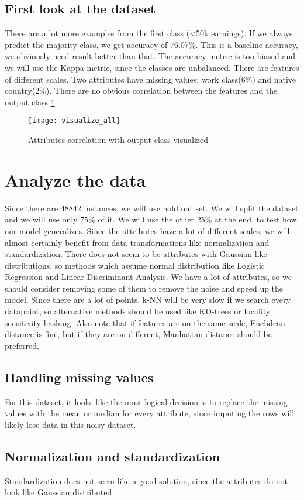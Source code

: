 \section{First look at the dataset}
There are a lot more examples from the first class (<50k earnings). If we always predict the majority class, we get accuracy of 76.07\%. This is a baseline accuracy, we obviously need result better than that. The accuracy metric is too biased and we will use the Kappa metric, since the classes are unbalanced. There are features of different scales. Two attributes have missing values: work class(6\%) and native country(2\%). There are no obvious correlation between the features and the output class \ref{fig:visual}.
\begin{figure}
    \centering
    \texttt{[image: visualize\_all]}
    \caption{Attributes correlation with output class visualized}
    \label{fig:visual}
\end{figure}

\chapter{Analyze the data}
Since there are 48842 instances, we will use hold out set. We will split the dataset and we will use only 75\% of it. We will use the other 25\% at the end, to test how our model generalizes. Since the attributes have a lot of different scales, we will almost certainly benefit from data transformations like normalization and standardization. There does not seem to be attributes with Gaussian-like distributions, so methods which assume normal distribution like Logistic Regression and Linear Discriminant Analysis. We have a lot of attributes, so we should consider removing some of them to remove the noise and speed up the model. Since there are a lot of points, k-NN will be very slow if we search every datapoint, so alternative methods should be used like KD-trees or locality sensitivity hashing. Also note that if features are on the same scale, Euclidean distance is fine, but if they are on different, Manhattan distance should be preferred.
\section{Handling missing values}
For this dataset, it looks like the most logical decision is to replace the missing values with the mean or median for every attribute, since imputing the rows will likely lose data in this noisy dataset.
\section{Normalization and standardization}
Standardization does not seem like a good solution, since the attributes do not look like Gaussian distributed.
